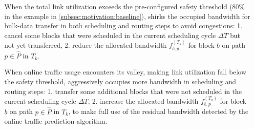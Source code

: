 {\begin{table}[t]
\begin{center}
\end{center}
\caption{}
\label{table:adjustment}
\end{table}

\begin{packeditemize}
\item When the total link utilization exceeds the pre-configured safety threshold (80\% in the example in \Section\ref{subsec:motivation:baseline}), \name shirks the occupied bandwidth for bulk-data transfer in both scheduling and routing steps to avoid congestions: 1. cancel some blocks that were scheduled in the current scheduling cycle $\Delta T$ but not yet transferred, 2. reduce the allocated bandwidth $f_{b,p}^{(T_k)}$ for block $b$ on path $p\in \hat{P}$ in $T_k$.

\item When online traffic usage encounters its valley, making link utilization fall below the safety threshold, \name aggressively occupies more bandwidth in scheduling and routing steps: 1. transfer some additional blocks that were not scheduled in the current scheduling cycle $\Delta T$, 2. increase the allocated bandwidth $f_{b,p}^{(T_k)}$ for block $b$ on path $p\in \hat{P}$ in $T_k$, to make full use of the residual bandwidth detected by the online traffic prediction algorithm.
\end{packeditemize}




}
